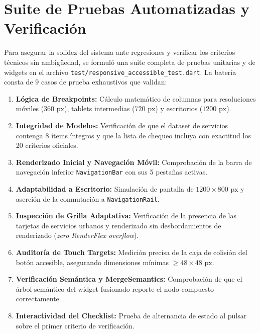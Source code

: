 \documentclass[12pt,a4paper]{article}
\begin{document}
\begin{small}
\begin{longtable}{p{0.8cm} p{2.5cm} p{5.5cm} p{3.2cm} p{1.8cm}}
\end{longtable}
\end{small}

\section{Suite de Pruebas Automatizadas y Verificación}

Para asegurar la solidez del sistema ante regresiones y verificar los criterios técnicos sin ambigüedad, se formuló una suite completa de pruebas unitarias y de widgets en el archivo \texttt{test/responsive\_accessible\_test.dart}. La batería consta de 9 casos de prueba exhaustivos que validan:
\begin{enumerate}[leftmargin=*]
    \item \textbf{Lógica de Breakpoints:} Cálculo matemático de columnas para resoluciones móviles ($360\text{ px}$), tablets intermedias ($720\text{ px}$) y escritorios ($1200\text{ px}$).
    \item \textbf{Integridad de Modelos:} Verificación de que el dataset de servicios contenga 8 ítems íntegros y que la lista de chequeo incluya con exactitud los 20 criterios oficiales.
    \item \textbf{Renderizado Inicial y Navegación Móvil:} Comprobación de la barra de navegación inferior \texttt{NavigationBar} con sus 5 pestañas activas.
    \item \textbf{Adaptabilidad a Escritorio:} Simulación de pantalla de $1200\times 800\text{ px}$ y aserción de la conmutación a \texttt{NavigationRail}.
    \item \textbf{Inspección de Grilla Adaptativa:} Verificación de la presencia de las tarjetas de servicios urbanos y renderizado sin desbordamientos de renderizado (\textit{zero RenderFlex overflow}).
    \item \textbf{Auditoría de Touch Targets:} Medición precisa de la caja de colisión del botón accesible, asegurando dimensiones mínimas $\ge 48\times 48\text{ px}$.
    \item \textbf{Verificación Semántica y MergeSemantics:} Comprobación de que el árbol semántico del widget fusionado reporte el nodo compuesto correctamente.
    \item \textbf{Interactividad del Checklist:} Prueba de alternancia de estado al pulsar sobre el primer criterio de verificación.
\end{enumerate}
\end{document}
